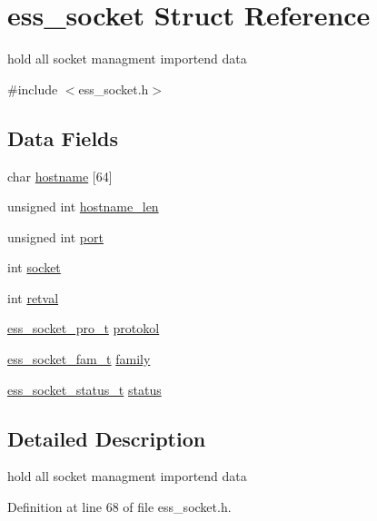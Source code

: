 \hypertarget{structess__socket}{}\section{ess\+\_\+socket Struct Reference}
\label{structess__socket}


hold all socket managment importend data  




{\ttfamily \#include $<$ess\+\_\+socket.\+h$>$}

\subsection*{Data Fields}
\begin{DoxyCompactItemize}
\item 
char \hyperlink{structess__socket_a0c6be700c8763c26054098348ebef8d6}{hostname} \mbox{[}64\mbox{]}
\item 
unsigned int \hyperlink{structess__socket_a4d0d74743d167680649419163ce8c80e}{hostname\+\_\+len}
\item 
unsigned int \hyperlink{structess__socket_a938bdc6ae46c346147b6d4f67ad1e704}{port}
\item 
int \hyperlink{structess__socket_a3666576f6b88007cc7b8f26c7da596c8}{socket}
\item 
int \hyperlink{structess__socket_a7f345697df7eb20c9aba1ab6980cae8f}{retval}
\item 
\hyperlink{ess__socket_8h_a1e8e8de805f8e0b7da25e3b177977273}{ess\+\_\+socket\+\_\+pro\+\_\+t} \hyperlink{structess__socket_a1f0429596710512357072b192ba3d2bd}{protokol}
\item 
\hyperlink{ess__socket_8h_a9305eae437d57846661e997bb755d150}{ess\+\_\+socket\+\_\+fam\+\_\+t} \hyperlink{structess__socket_ad09623d57ebd33fef8dac4e18c0cba2f}{family}
\item 
\hyperlink{ess__socket_8h_ae3a6dc482fc34f9ea0361820ba4be573}{ess\+\_\+socket\+\_\+status\+\_\+t} \hyperlink{structess__socket_a4e47521e8af756b9edf77f1f02f9b725}{status}
\end{DoxyCompactItemize}


\subsection{Detailed Description}
hold all socket managment importend data 

Definition at line 68 of file ess\+\_\+socket.\+h.



